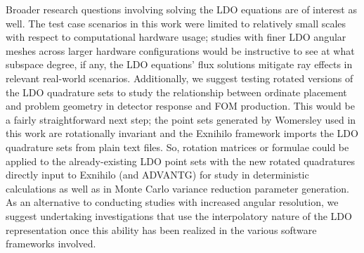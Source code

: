 Broader research questions involving solving the LDO equations are of interest as well. The test
case scenarios in this work were limited to relatively small scales with respect to computational
hardware usage; studies with finer LDO angular meshes across larger hardware configurations would
be instructive to see at what subspace degree, if any, the LDO equations' flux solutions mitigate 
ray effects in relevant real-world scenarios. Additionally, we suggest testing rotated versions 
of the LDO quadrature sets to study the relationship between ordinate placement and problem 
geometry in detector response and FOM production. This would be a fairly straightforward next 
step; the point sets generated by Womersley used in this work are rotationally invariant and the 
Exnihilo framework imports the LDO quadrature sets from plain text files. So, rotation matrices or
formulae could be applied to the already-existing LDO point sets with the new rotated quadratures 
directly input to Exnihilo (and ADVANTG) for study in deterministic calculations as well as in 
Monte Carlo variance reduction parameter generation. As an alternative to conducting studies with
increased angular resolution, we suggest undertaking investigations that use the interpolatory
nature of the LDO representation once this ability has been realized in the various software
frameworks involved.
